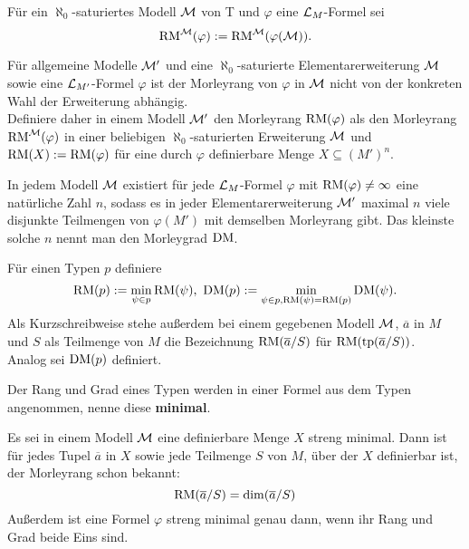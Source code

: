 	\begin{definition}
		Für ein $\aleph_0$-saturiertes Modell $\mathcal{M}$ von T und $\varphi$ eine $\mathcal{L}_M$-Formel sei $$\operatorname{RM}^{\mathcal{M}}(\varphi):=\operatorname{RM}^{\mathcal{M}}(\varphi(\mathcal{M})).$$
	\end{definition}
	\newpage
	\begin{factdef}
		Für allgemeine Modelle $\mathcal{M}'$ und eine $\aleph_0$-saturierte Elementarerweiterung $\mathcal{M}$ sowie eine $\mathcal{L}_{M'}$-Formel $\varphi$ ist der Morleyrang von $\varphi$ in $\mathcal{M}$ nicht von der konkreten Wahl der Erweiterung abhängig.\\
		Definiere daher in einem Modell $\mathcal{M}'$ den Morleyrang $\operatorname{RM}(\varphi)$ als den Morleyrang $\operatorname{RM}^{\mathcal{M}}(\varphi)$ in einer beliebigen $\aleph_0$-saturierten Erweiterung $\mathcal{M}$ und $\operatorname{RM}(X):=\operatorname{RM}(\varphi)$ für eine durch $\varphi$ definierbare Menge $X\subseteq(M')^n$.
	\end{factdef}
	
	\begin{factdef}
		In jedem Modell $\mathcal{M}$ existiert für jede $\mathcal{L}_M$-Formel $\varphi$ mit $\operatorname{RM}(\varphi)\neq\infty$ eine natürliche Zahl $n$, sodass es in jeder Elementarerweiterung $\mathcal{M}'$ maximal $n$ viele disjunkte Teilmengen von $\varphi(M')$ mit demselben Morleyrang gibt. Das kleinste solche $n$ nennt man den Morleygrad $\operatorname{DM}$.
	\end{factdef}
	
	\begin{definition}
		Für einen Typen $p$ definiere $$\operatorname{RM}(p):=\min\limits_{\psi\in p}\operatorname{RM}(\psi),\ \operatorname{DM}(p):=\min\limits_{\psi\in p,\operatorname{RM}(\psi)=\operatorname{RM}(p)}\operatorname{DM}(\psi).$$
		Als Kurzschreibweise stehe außerdem bei einem gegebenen Modell $\mathcal{M}$, $\overline{a}$ in $M$ und $S$ als Teilmenge von $M$ die Bezeichnung $\operatorname{RM}(\overline{a}/S)$ für $\operatorname{RM}(\operatorname{tp}(\overline{a}/S))$.\\
		Analog sei $\operatorname{DM}(p)$ definiert.
	\end{definition}
	\begin{remark}
		Der Rang und Grad eines Typen werden in einer Formel aus dem Typen angenommen, nenne diese \textbf{minimal}.
	\end{remark}
	
	\begin{fact}
		Es sei in einem Modell $\mathcal{M}$ eine definierbare Menge $X$ streng minimal. Dann ist für jedes Tupel $\overline{a}$ in $X$ sowie jede Teilmenge $S$ von $M$, über der $X$ definierbar ist, der Morleyrang schon bekannt: $$\operatorname{RM}(\overline{a}/S)=\dim(\overline{a}/S)$$
		Außerdem ist eine Formel $\varphi$ streng minimal genau dann, wenn ihr Rang und Grad beide Eins sind.
	\end{fact}
	
